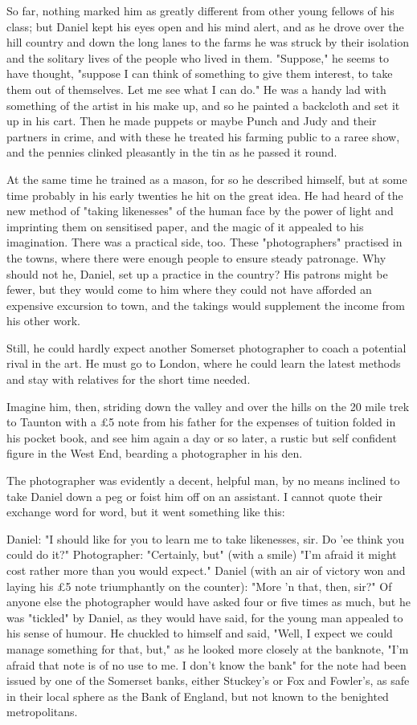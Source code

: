 So far, nothing marked him as greatly different from other young fellows of his class; but Daniel kept his eyes open and his mind alert, and as he drove over the hill country and down the long lanes to the farms he was struck by their isolation and the solitary lives of the people who lived in them. "Suppose," he seems to have thought, "suppose I can think of something to give them interest, to take them out of themselves. Let me see what I can do." He was a handy lad with something of the artist in his make up, and so he painted a backcloth and set it up in his cart. Then he made puppets or maybe Punch and Judy and their partners in crime, and with these he treated his farming public to a raree show, and the pennies clinked pleasantly in the tin as he passed it round. 

At the same time he trained as a mason, for so he described himself, but at some time probably in his early twenties he hit on the great idea. He had heard of the new method of "taking likenesses" of the human face by the power of light and imprinting them on sensitised paper, and the magic of it appealed to his imagination. There was a practical side, too. These "photographers" practised in the towns, where there were enough people to ensure steady patronage. Why should not he, Daniel, set up a practice in the country? His patrons might be fewer, but they would come to him where they could not have afforded an expensive excursion to town, and the takings would supplement the income from his other work.

Still, he could hardly expect another Somerset photographer to coach a potential rival in the art. He must go to London, where he could learn the latest methods and stay with relatives for the short time needed. 

Imagine him, then, striding down the valley and over the hills on the 20 mile trek to Taunton with a £5 note from his father for the expenses of tuition folded in his pocket book, and see him again a day or so later, a rustic but self confident figure in the West End, bearding a photographer in his den.

The photographer was evidently a decent, helpful man, by no means inclined to take Daniel down a peg or foist him off on an assistant. I cannot quote their exchange word for word, but it went something like this:

Daniel: "I should like for you to learn me to take likenesses, sir. Do 'ee think you could do it?"
 Photographer: "Certainly, but" (with a smile) "I'm afraid it might cost rather more than you would expect."
 Daniel (with an air of victory won and laying his £5 note triumphantly on the counter): "More 'n that, then, sir?"
 Of anyone else the photographer would have asked four or five times as much, but he was "tickled" by Daniel, as they would have said, for the young man appealed to his sense of humour. He chuckled to himself and said, "Well, I expect we could manage something for that, but," as he looked more closely at the banknote, "I'm afraid that note is of no use to me. I don't know the bank"   for the note had been issued by one of the Somerset banks, either Stuckey's or Fox and Fowler's, as safe in their local sphere as the Bank of England, but not known to the benighted metropolitans.

